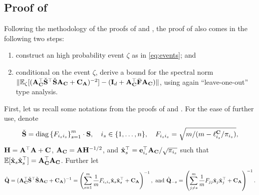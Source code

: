 \documentclass[11pt,a4paper]{article}
\begin{document}
\subsection{Proof of }
\label{sec:proof_sec_moment}


Following the methodology of the proofs of  and , the proof of  also comes in the following two steps:
\begin{enumerate}
  \item construct an high probability event $\zeta$ as in \eqref{eq:events}; and
  \item conditional on the event $\zeta$, derive a bound for the spectral norm $\|{\mathbb{E}}_{\zeta}[(\mathbf{A}_{\mathbf{C}}^\top  \check{\mathbf{S}}^\top \check{\mathbf{S}} \mathbf{A}_{\mathbf{C}} + \mathbf{C}_{\mathbf{A}} )^{-2}] - (\mathbf{I}_d+\mathbf{A}_{\mathbf{C}}^\top\bar {\mathbf{F}}\mathbf{A}_{\mathbf{C}}) \|$,  using again ``leave-one-out'' type analysis.
\end{enumerate}

First, let us recall some notations from the proofs of  and .  
For the ease of further use, denote 
\begin{equation*}
    \check{\mathbf{S}}= \operatorname{diag} \left\{F_{i_si_s} \right\}^m_{s=1}\cdot\mathbf{S}, \quad  i_s\in \{1,\ldots,n\}, \quad F_{i_si_s}=\sqrt{m/(m-\ell_{i_s}^{\mathbf{C}}/\pi_{i_s})},
\end{equation*}
$\mathbf{H}=\mathbf{A}^\top\mathbf{A}+\mathbf{C}$,    $\mathbf{A}_{\mathbf{C}}=\mathbf{A}\mathbf{H}^{-1/2}$, and  $\hat{\mathbf{x}}^\top_s=\mathbf{e}^\top_{i_s}\mathbf{A}_{\mathbf{C}}/\sqrt{\pi_{i_s}}$ such that ${\mathbb{E}}[\hat{\mathbf{x}}_s\hat{\mathbf{x}}_s^\top]=\mathbf{A}_{\mathbf{C}}^\top \mathbf{A}_{\mathbf{C}}$. 
Further let
\begin{equation*}
    \hat{\mathbf{Q}}=(\mathbf{A}_{\mathbf{C}}^\top  \check{\mathbf{S}}^\top\check{\mathbf{S}}\mathbf{A}_{\mathbf{C}} + \mathbf{C}_{\mathbf{A}} )^{-1}= \left(\sum^m_{s=1}\frac{1}{m}F_{i_si_s}\hat{\mathbf{x}}_s\hat{\mathbf{x}}_s^\top + \mathbf{C}_{\mathbf{A}} \right)^{-1},~\text{and}~\hat{\mathbf{Q}}_{-s}= \left(\sum^m_{j\neq s}\frac{1}{m} F_{jj}\hat{\mathbf{x}}_j\hat{\mathbf{x}}_j^\top + \mathbf{C}_{\mathbf{A}} \right)^{-1}.
\end{equation*}
\end{document}
